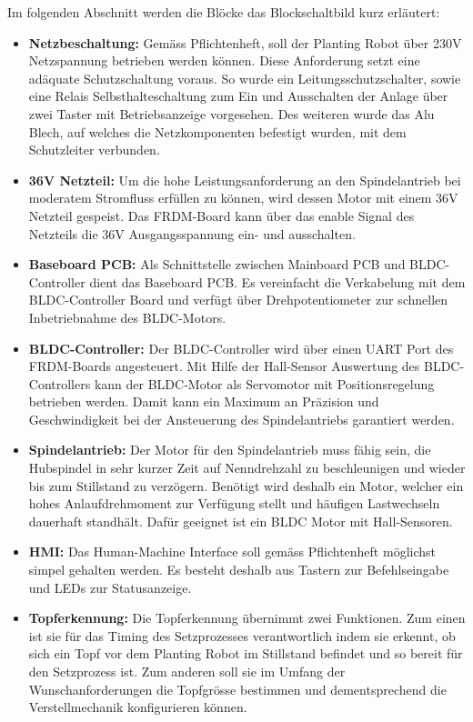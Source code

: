 Im folgenden Abschnitt werden die Blöcke das Blockschaltbild kurz erläutert:
\begin{itemize}
	\item \textbf{Netzbeschaltung:} Gemäss Pflichtenheft, soll der Planting Robot über 230V Netzspannung betrieben werden können. Diese Anforderung setzt eine adäquate Schutzschaltung voraus. So wurde ein Leitungsschutzschalter, sowie eine Relais Selbsthalteschaltung zum Ein und Ausschalten der Anlage über zwei Taster mit Betriebsanzeige vorgesehen. Des weiteren wurde das Alu Blech, auf welches die Netzkomponenten befestigt wurden, mit dem Schutzleiter verbunden.

	\item \textbf{36V Netzteil:} Um die hohe Leistungsanforderung an den Spindelantrieb bei moderatem Stromfluss erfüllen zu können, wird dessen Motor mit einem 36V Netzteil gespeist. Das FRDM-Board kann über das enable Signal des Netzteils die 36V Ausgangsspannung ein- und ausschalten.
	
	\item \textbf{Baseboard PCB:} Als Schnittstelle zwischen Mainboard PCB und BLDC-Controller dient das Baseboard PCB. Es vereinfacht die Verkabelung mit dem BLDC-Controller Board und verfügt über Drehpotentiometer zur schnellen Inbetriebnahme des BLDC-Motors.
	
	\item \textbf{BLDC-Controller:} Der BLDC-Controller wird über einen UART Port des FRDM-Boards angesteuert. Mit Hilfe der Hall-Sensor Auswertung des BLDC-Controllers kann der BLDC-Motor als Servomotor mit Positionsregelung betrieben werden. Damit kann ein Maximum an Präzision und Geschwindigkeit bei der Ansteuerung des Spindelantriebs garantiert werden.
	
	\item \textbf{Spindelantrieb:} Der Motor für den Spindelantrieb muss fähig sein, die Hubspindel in sehr kurzer Zeit auf Nenndrehzahl zu beschleunigen und wieder bis zum Stillstand zu verzögern. Benötigt wird deshalb ein Motor, welcher ein hohes Anlaufdrehmoment zur Verfügung stellt und häufigen Lastwechseln dauerhaft standhält. Dafür geeignet ist ein BLDC Motor mit Hall-Sensoren.
		
	\item \textbf{HMI:} Das Human-Machine Interface soll gemäss Pflichtenheft möglichst simpel gehalten werden. Es besteht deshalb aus Tastern zur Befehlseingabe und LEDs zur Statusanzeige. 
		
	\item \textbf{Topferkennung:} Die Topferkennung übernimmt zwei Funktionen. Zum einen ist sie für das Timing des Setzprozesses verantwortlich indem sie erkennt, ob sich ein Topf vor dem Planting Robot im Stillstand befindet und so bereit für den Setzprozess ist. Zum anderen soll sie im Umfang der Wunschanforderungen die Topfgrösse bestimmen und dementsprechend die Verstellmechanik konfigurieren können.
	

\end{itemize}
